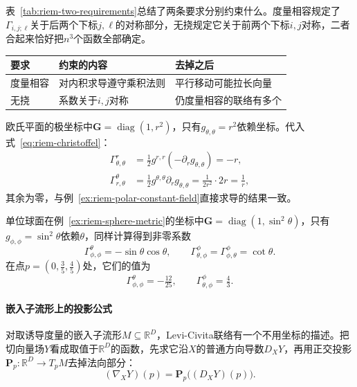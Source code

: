 表~\ref{tab:riem-two-requirements}总结了两条要求分别约束什么。度量相容规定了$\Gamma_{i,j;\ell}$关于后两个下标$j,\ell$的对称部分，无挠规定它关于前两个下标$i,j$对称，二者合起来恰好把$n^3$个函数全部确定。

\begin{BookInlineTable}
  \centering
  \begin{tabular}{lll}
    \toprule
    要求 & 约束的内容 & 去掉之后\\
    \midrule
    度量相容 & 对内积求导遵守乘积法则 & 平行移动可能拉长向量\\
    无挠 & 系数关于$i,j$对称 & 仍度量相容的联络有多个\\
    \bottomrule
  \end{tabular}
  \caption{Levi-Civita联络的两条要求。}
  \label{tab:riem-two-requirements}
\end{BookInlineTable}

\begin{example}[由度量求Christoffel符号]
\label{ex:riem-christoffel-examples}
欧氏平面的极坐标中$\bm G=\operatorname{diag}(1,r^2)$，只有$g_{\theta,\theta}=r^2$依赖坐标。代入式~\eqref{eq:riem-christoffel}：
\[
\begin{aligned}
\Gamma^r_{\theta,\theta}&=\frac12g^{r,r}(-\partial_rg_{\theta,\theta})=-r,\\
\Gamma^\theta_{r,\theta}&=\frac12g^{\theta,\theta}\partial_rg_{\theta,\theta}=\frac1{2r^2}\cdot2r=\frac1r,
\end{aligned}
\]
其余为零，与例~\ref{ex:riem-polar-constant-field}直接求导的结果一致。

单位球面在例~\ref{ex:riem-sphere-metric}的坐标中$\bm G=\operatorname{diag}(1,\sin^2\theta)$，只有$g_{\phi,\phi}=\sin^2\theta$依赖$\theta$，同样计算得到非零系数
\begin{equation}
\Gamma^\theta_{\phi,\phi}=-\sin\theta\cos\theta,\qquad\Gamma^\phi_{\theta,\phi}=\Gamma^\phi_{\phi,\theta}=\cot\theta .
\label{eq:riem-sphere-christoffel}
\end{equation}
在点$p=(0,\tfrac35,\tfrac45)$处，它们的值为
\[
\Gamma^\theta_{\phi,\phi}=-\tfrac{12}{25},\qquad\Gamma^\phi_{\theta,\phi}=\tfrac43 .
\]
\end{example}

\paragraph{嵌入子流形上的投影公式}
对取诱导度量的嵌入子流形$M\subseteq\mathbb R^D$，Levi-Civita联络有一个不用坐标的描述。把切向量场$Y$看成取值于$\mathbb R^D$的函数，先求它沿$X$的普通方向导数$D_XY$，再用正交投影$\bm P_p:\mathbb R^D\to T_pM$去掉法向部分：
\begin{equation}
(\nabla_XY)(p)=\bm P_p\bigl((D_XY)(p)\bigr).
\label{eq:riem-projection-connection}
\end{equation}

